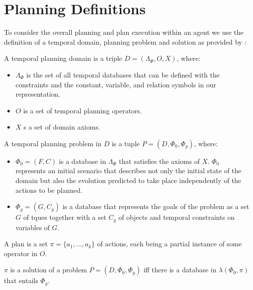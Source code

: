 \section{Planning Definitions}

To consider the overall planning and plan execution within an agent we
use the definition of a temporal domain, planning problem and solution
as provided by \cite{Nau:2004}:
\begin{definition}
  \label{def:domain}
  A temporal planning domain is a triple $D = ( \Lambda_\Phi, O, X )$, where:
  \begin{itemize}
  \item $\Lambda_\Phi$ is the set of all temporal databases that can be 
    defined with the constraints and the constant, variable, and relation 
    symbols in our representation.
  \item $O$ is a set of temporal planning operators.
  \item $X$ s a set of domain axioms.
  \end{itemize}
\end{definition}

\begin{definition}
  \label{def:problem}
  A temporal planning problem in $D$ is a tuple $P = ( D, \Phi_0, \Phi_g )$, where:
  \begin{itemize}
  \item $\Phi_0 = (F, C)$ is a database in $\Lambda_\Phi$ that satisfies the axioms of $X$.
    $\Phi_0$ represents an initial scenario that describes not only the initial 
    state of the domain but also the evolution predicted to take place 
    independently of the actions to be planned.
  \item $\Phi_g = (G, C_g)$ is a database that represents the goals of the problem 
    as a set $G$ of tques together with a set $C_g$ of objects and temporal 
    constraints on variables of $G$. 
  \end{itemize}
\end{definition}

\begin{definition}
  \label{def:plan}
A plan is a set $\pi = \{a_1,...,a_k\}$ of actions, each
  being a partial instance of some operator in $O$.  

  $\pi$ is a solution of a problem $P = (D, \Phi_0, \Phi_g)$ iff
  there is a  database in $\lambda(\Phi_0, \pi)$ that entails $\Phi_g$.
\end{definition}

